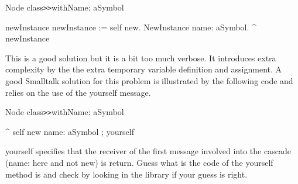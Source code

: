 \begin{code}
Node class\texttt{>>}withName: aSymbol

 \ttt{|}newInstance\ttt{|}
 newInstance := self new.
 NewInstance name: aSymbol.
 ^ newInstance
\end{code}


This is a good solution but it is a bit too much verbose. It 
introduces extra complexity by the the extra temporary variable 
definition and assignment. A good Smalltalk solution for this 
problem is illustrated by the following code and relies on the 
use of the yourself message. 


\begin{code}
Node class\texttt{>>}withName: aSymbol

   ^ self new name: aSymbol ; yourself
\end{code}

yourself specifies that the receiver of the first message involved 
into the cascade (name: here and not new) is return. Guess what 
is the code of the yourself method is and check by looking in 
the library if your guess is right.





\endinput